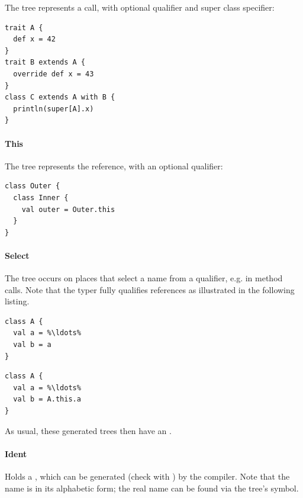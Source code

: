 \noindent The  tree represents a  call, with optional qualifier and super class specifier:

\begin{lstlisting}
trait A {
  def x = 42
}
trait B extends A {
  override def x = 43
}
class C extends A with B {
  println(super[A].x)
}
\end{lstlisting}

\paragraph{This} 

\noindent The  tree represents the  reference, with an optional qualifier:
\begin{lstlisting}
class Outer {
  class Inner {
    val outer = Outer.this
  }
}
\end{lstlisting}

\paragraph{Select} 

\noindent The  tree occurs on places that select a name from a qualifier, e.g. in method calls. Note that the typer fully qualifies references as illustrated in the following listing.

\begin{multicols}{2}
\begin{lstlisting}
class A {
  val a = %\ldots%
  val b = a
}
\end{lstlisting}
\begin{lstlisting}  
class A {
  val a = %\ldots%
  val b = A.this.a
}
\end{lstlisting}
\end{multicols}

As usual, these generated trees then have an .

\paragraph{Ident} 

\noindent Holds a , which can be generated (check with ) by the compiler. Note that the name is in its alphabetic form; the real name can be found via the tree's symbol.

